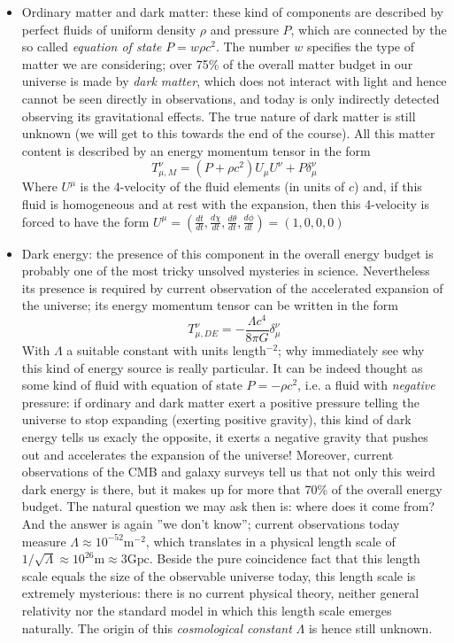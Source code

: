 \begin{itemize}
\item Ordinary matter and dark matter: these kind of components are described by perfect fluids of uniform density $\rho$ and pressure $P$, which are connected by the so called \textit{equation of state} $P=w\rho c^2$. The number $w$ specifies the type of matter we are considering; over 75\% of the overall matter budget in our universe is made by \textit{dark matter}, which does not interact with light and hence cannot be seen directly in observations, and today is only indirectly detected observing its gravitational effects. The true nature of dark matter is still unknown (we will get to this towards the end of the course). All this matter content is described by an energy momentum tensor in the form 
\begin{equation}
T_{\mu,M}^\nu=(P+\rho c^2)U_\mu U^\nu + P\delta_\mu ^ \nu
\end{equation} 
Where $U^\mu$ is the 4-velocity of the fluid elements (in units of $c$) and, if this fluid is homogeneous and at rest with the expansion, then this 4-velocity is forced to have the form $U^\mu=\left(\frac{dt}{dt},\frac{d\chi}{dt},\frac{d\theta}{dt},\frac{d\phi}{dt}\right)=(1,0,0,0)$
\item Dark energy: the presence of this component in the overall energy budget is probably one of the most tricky unsolved mysteries in science. Nevertheless its presence is required by current observation of the accelerated expansion of the universe; its energy momentum tensor can be written in the form
\begin{equation}
T_{\mu,DE}^\nu=-\frac{\Lambda c^4}{8\pi G}\delta_\mu^\nu
\end{equation}
With $\Lambda$ a suitable constant with units length$^{-2}$; why immediately see why this kind of energy source is really particular. It can be indeed thought as some kind of fluid with equation of state $P=-\rho c^2$, i.e. a fluid with \textit{negative} pressure: if ordinary and dark matter exert a positive pressure telling the universe to stop expanding (exerting positive gravity), this kind of dark energy tells us exacly the opposite, it exerts a negative gravity that pushes out and accelerates the expansion of the universe! Moreover, current observations of the CMB and galaxy surveys tell us that not only this weird dark energy is there, but it makes up for more that 70\% of the overall energy budget. The natural question we may ask then is: where does it come from? And the answer is again ''we don't know''; current observations today measure $\Lambda \approx 10^{-52}\mathrm{m}^{-2}$, which translates in a physical length scale of $1/\sqrt{\Lambda}\approx 10^{26}\mathrm{m}\approx 3\mathrm{Gpc}$. Beside 
the pure coincidence fact that this length scale equals the size of the observable universe today, this length scale is extremely mysterious: there is no current physical theory, neither general relativity nor the standard model in which this length scale emerges naturally. The origin of this \textit{cosmological constant} $\Lambda$ is hence still unknown. 
\end{itemize}
